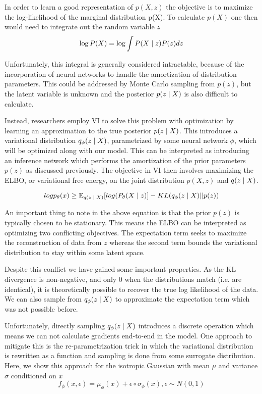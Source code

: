 In order to learn a good representation of $p(X,z)$ the objective is to maximize the log-likelihood of the marginal distribution p(X). To calculate $p(X)$ one then would need to integrate out the random variable $z$
\begin{equation}
\log P(X) = \log \int P(X \; | \;{z}) P(z) dz
\end{equation}

Unfortunately, this integral is generally considered intractable, because of the incorporation of neural networks to handle the amortization of distribution parameters. This could be addressed by Monte Carlo sampling from $p(z)$, but the latent variable is unknown and the posterior $p(z \; | \;{X})$ is also difficult to calculate. 

Instead, researchers employ \ac{VI} to solve this problem with optimization by learning an approximation to the true posterior $p(z \; | \;{X})$. This introduces a variational distribution $q_{\phi}(z \; | \;{X})$, parametrized by some neural network $\phi$, which will be optimized along with our model. This can be interpreted as introducing an inference network which performs the amortization of the prior parameters $p(z)$ as discussed previously. The objective in \ac{VI} then involves maximizing the \ac{ELBO}, or variational free energy, on the joint distribution $p(X, z)$ and $q(z \; | \;{X})$. 

\begin{equation}
	log p_{\theta}(x) \geq \operatorname{\mathbb{E}}_{q(z \; | \;{X})} [ log(P_{\theta}(X \; | \;{z}) ]  - KL(q_{\phi}(z \; | \;{X}) || p(z))
\end{equation}

An important thing to note in the above equation is that the prior $p(z)$ is typically chosen to be stationary. This means the \ac{ELBO} can be interpreted as optimizing two conflicting objectives. The expectation term seeks to maximize the reconstruction of data from $z$ whereas the second term bounds the variational distribution to stay within some latent space.

Despite this conflict we have gained some important properties. As the KL divergence is non-negative, and only 0 when the distributions match (i.e. are identical), it is theoretically possible to recover the true log likelihood of the data. We can also sample from $q_{\phi}(z \; | \;{X})$ to approximate the expectation term which was not possible before.

Unfortunately, directly sampling $q_{\phi}(z \; | \;{X})$ introduces a discrete operation which means we can not calculate gradients end-to-end in the model. One approach to mitigate this is the re-parametrization trick \cite{kingma2014autoencodingVB,rezende2014stochasticBackprop} in which the variational distribution  is rewritten as a function and sampling is done from some surrogate distribution. Here, we show this approach for the isotropic Gaussian with mean $\mu$ and variance $\sigma$ conditioned on $x$
\begin{equation}
f_{\phi}(x, \epsilon) = \mu_{\phi}(x) + \epsilon \circ \sigma_{\phi}(x), \epsilon \sim N(0, 1)
\end{equation}


